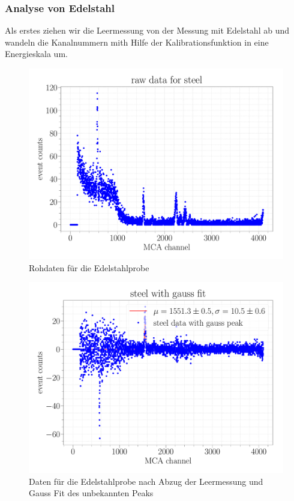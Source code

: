 \documentclass[a4paper,14pt]{article}
\begin{document}
\subsubsection{Analyse von Edelstahl}
Als erstes ziehen wir die Leermessung von der Messung mit Edelstahl ab und wandeln die Kanalnummern mith Hilfe der Kalibrationsfunktion in eine Energieskala um.

\begin{figure}[H]
\centering
\includegraphics[scale=0.25]{../Figures/am_fe_raw.pdf}
\caption{Rohdaten für die Edelstahlprobe}
\label{am_fe_raw}
\end{figure}


\begin{figure}[H]
\centering
\includegraphics[scale=0.25]{../Figures/am_fe_gauss.pdf}
\caption{Daten für die Edelstahlprobe nach Abzug der Leermessung und Gauss Fit des unbekannten Peaks}
\label{resolution}
\end{figure}
\end{document}

